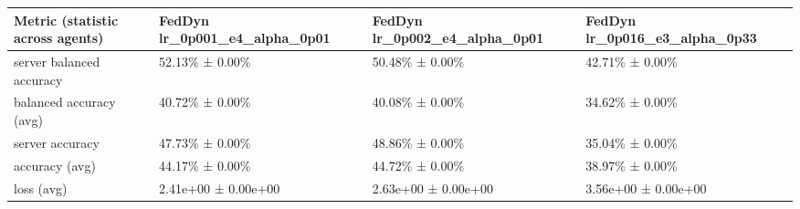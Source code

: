 \begin{tabular}{llll}
\hline
 Metric (statistic across agents)   & FedDyn lr\_0p001\_e4\_alpha\_0p01   & FedDyn lr\_0p002\_e4\_alpha\_0p01   & FedDyn lr\_0p016\_e3\_alpha\_0p33   \\
\hline
 server balanced accuracy           & 52.13\% ± 0.00\%                  & 50.48\% ± 0.00\%                  & 42.71\% ± 0.00\%                  \\
 balanced accuracy (avg)            & 40.72\% ± 0.00\%                  & 40.08\% ± 0.00\%                  & 34.62\% ± 0.00\%                  \\
 server accuracy                    & 47.73\% ± 0.00\%                  & 48.86\% ± 0.00\%                  & 35.04\% ± 0.00\%                  \\
 accuracy (avg)                     & 44.17\% ± 0.00\%                  & 44.72\% ± 0.00\%                  & 38.97\% ± 0.00\%                  \\
 loss (avg)                         & 2.41e+00 ± 0.00e+00             & 2.63e+00 ± 0.00e+00             & 3.56e+00 ± 0.00e+00             \\
\hline
\end{tabular}